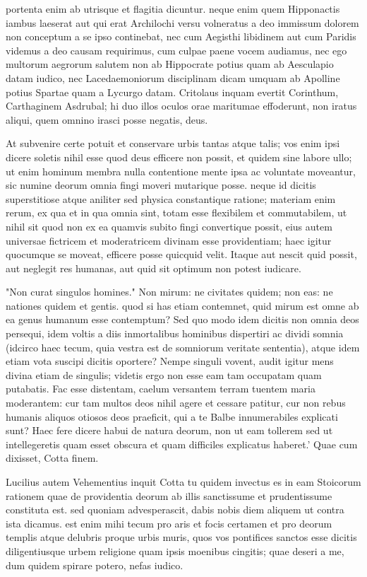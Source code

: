  portenta enim ab utrisque et flagitia dicuntur. neque enim quem Hipponactis iambus laeserat aut qui erat Archilochi versu volneratus a deo immissum dolorem non conceptum a se ipso continebat, nec cum Aegisthi libidinem aut cum Paridis videmus a deo causam requirimus, cum culpae paene vocem audiamus, nec ego multorum aegrorum salutem non ab Hippocrate potius quam ab Aesculapio datam iudico, nec Lacedaemoniorum disciplinam dicam umquam ab Apolline potius Spartae quam a Lycurgo datam. Critolaus inquam evertit Corinthum, Carthaginem Asdrubal; hi duo illos oculos orae maritumae effoderunt, non iratus aliqui, quem omnino irasci posse negatis, deus.

 At subvenire certe potuit et conservare urbis tantas atque talis; vos enim ipsi dicere soletis nihil esse quod deus efficere non possit, et quidem sine labore ullo; ut enim hominum membra nulla contentione mente ipsa ac voluntate moveantur, sic numine deorum omnia fingi moveri mutarique posse. neque id dicitis superstitiose atque aniliter sed physica constantique ratione; materiam enim rerum, ex qua et in qua omnia sint, totam esse flexibilem et commutabilem, ut nihil sit quod non ex ea quamvis subito fingi convertique possit, eius autem universae fictricem et moderatricem divinam esse providentiam; haec igitur quocumque se moveat, efficere posse quicquid velit. Itaque aut nescit quid possit, aut neglegit res humanas, aut quid sit optimum non potest iudicare.

 "Non curat singulos homines." Non mirum: ne civitates quidem; non eas: ne nationes quidem et gentis. quod si has etiam contemnet, quid mirum est omne ab ea genus humanum esse contemptum? Sed quo modo idem dicitis non omnia deos persequi, idem voltis a diis inmortalibus hominibus dispertiri ac dividi somnia (idcirco haec tecum, quia vestra est de somniorum veritate sententia), atque idem etiam vota suscipi dicitis oportere? Nempe singuli vovent, audit igitur mens divina etiam de singulis; videtis ergo non esse eam tam occupatam quam putabatis. Fac esse distentam, caelum versantem terram tuentem maria moderantem: cur tam multos deos nihil agere et cessare patitur, cur non rebus humanis aliquos otiosos deos praeficit, qui a te Balbe innumerabiles explicati sunt? Haec fere dicere habui de natura deorum, non ut eam tollerem sed ut intellegeretis quam esset obscura et quam difficiles explicatus haberet.' Quae cum dixisset, Cotta finem.

 Lucilius autem Vehementius inquit Cotta tu quidem invectus es in eam Stoicorum rationem quae de providentia deorum ab illis sanctissume et prudentissume constituta est. sed quoniam advesperascit, dabis nobis diem aliquem ut contra ista dicamus. est enim mihi tecum pro aris et focis certamen et pro deorum templis atque delubris proque urbis muris, quos vos pontifices sanctos esse dicitis diligentiusque urbem religione quam ipsis moenibus cingitis; quae deseri a me, dum quidem spirare potero, nefas iudico.

